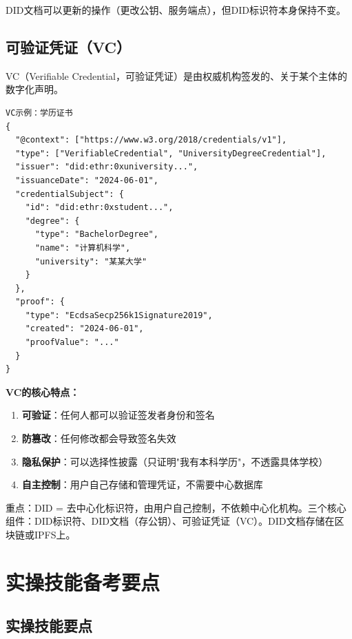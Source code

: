 ﻿\documentclass[12pt,a4paper]{article}
\begin{document}
DID文档可以更新的操作（更改公钥、服务端点），但DID标识符本身保持不变。

\subsection{可验证凭证（VC）}

VC（Verifiable Credential，可验证凭证）是由权威机构签发的、关于某个主体的数字化声明。

\begin{lstlisting}
VC示例：学历证书
{
  "@context": ["https://www.w3.org/2018/credentials/v1"],
  "type": ["VerifiableCredential", "UniversityDegreeCredential"],
  "issuer": "did:ethr:0xuniversity...",
  "issuanceDate": "2024-06-01",
  "credentialSubject": {
    "id": "did:ethr:0xstudent...",
    "degree": {
      "type": "BachelorDegree",
      "name": "计算机科学",
      "university": "某某大学"
    }
  },
  "proof": {
    "type": "EcdsaSecp256k1Signature2019",
    "created": "2024-06-01",
    "proofValue": "..."
  }
}
\end{lstlisting}

\begin{theorybox}
\textbf{VC的核心特点：}
\begin{enumerate}
\item \textbf{可验证}：任何人都可以验证签发者身份和签名
\item \textbf{防篡改}：任何修改都会导致签名失效
\item \textbf{隐私保护}：可以选择性披露（只证明"我有本科学历"，不透露具体学校）
\item \textbf{自主控制}：用户自己存储和管理凭证，不需要中心数据库
\end{enumerate}
\end{theorybox}

\begin{keypointbox}
重点：DID = 去中心化标识符，由用户自己控制，不依赖中心化机构。三个核心组件：DID标识符、DID文档（存公钥）、可验证凭证（VC）。DID文档存储在区块链或IPFS上。
\end{keypointbox}

\section{实操技能备考要点}

\subsection{实操技能要点}
\end{document}

